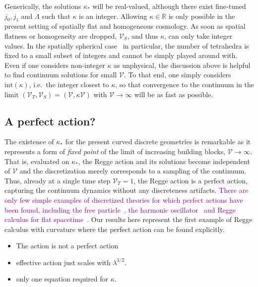 \documentclass[amsmath,amssymb,aps,twocolumn,superscriptaddress,nofootinbib]{revtex4-1}
\newcommand{\R}{\mathbb{R}}
\newcommand{\caj}[1]{\textcolor{purple}{#1}}
\begin{document}
Generically, the solutions $\kappa_*$ will be real-valued, although there exist fine-tuned $j_0,j_1$ and $\Lambda$ such that $\kappa$ is an integer.
Allowing $\kappa\in\R$ is only possible in the present setting of spatially flat and homogeneous cosmology. 
As soon as spatial flatness or homogeneity are dropped, $\mathcal{V}_S$, and thus $\kappa$, can only take integer values.
In the spatially spherical case~\cite{Dittrich:2021gww} in particular, the number of tetrahedra is fixed to a small subset of integers and cannot be simply played around with.
Even if one considers non-integer $\kappa$ as unphysical, the discussion above is helpful to find continuum solutions for small $\mathcal{V}$.
To that end, one simply considers $\mathrm{int}(\kappa)$, i.e.~the integer closest to $\kappa$, so that convergence to the continuum in the limit $(\mathcal{V}_T,\mathcal{V}_S) = (\mathcal{V},\kappa\mathcal{V})$ with $\mathcal{V}\rightarrow\infty$ will be as fast as possible.

\subsection{A perfect action?}




The existence of $\kappa_*$ for the present curved discrete geometries is remarkable as it represents a form of \textit{fixed point} of the limit of increasing building blocks, $\mathcal{V}\rightarrow\infty$.
That is, evaluated on $\kappa_*$, the Regge action and its solutions become independent of $\mathcal{V}$ and the discretization merely corresponds to a sampling of the continuum.
Thus, already at a single time step $\mathcal{V}_T=1$, the Regge action is a perfect action, capturing the continuum dynamics without any discreteness artifacts.
\caj{There are only few simple examples of discretized theories for which perfect actions have been found, including the free particle~\cite{}, the harmonic oscillator~\cite{} and Regge calculus for flat spacetime~\cite{}.}
Our results here represent the first example of Regge calculus with curvature where the perfect action can be found explicitly.





\begin{itemize}
  \item The action is not a perfect action
  \item effective action just scales with $\lambda^{3/2}$.
  \item only one equation required for $\kappa$.
\end{itemize}
\end{document}
